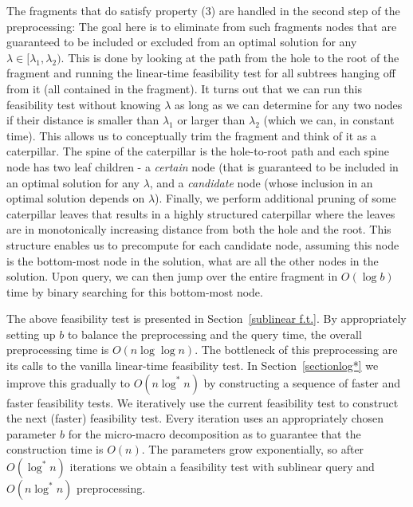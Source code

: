 \documentclass[11pt,a4paper]{article}
\theoremstyle{definition}
\theoremstyle{remark}
\begin{document}
The fragments that do satisfy property (3) are handled in the second step of the preprocessing: The goal here is to eliminate from such fragments nodes that are guaranteed to be included or excluded from an optimal solution for any $\lambda \in [\lambda_1,\lambda_2)$. This is done by looking at the path from the hole to the root of the fragment and running the linear-time feasibility test for all subtrees hanging off from it (all contained in the fragment). It turns out that we can run this feasibility test without knowing $\lambda$ as long as we can determine for any two nodes if their distance is smaller than $\lambda_1$ or larger than $\lambda_2$ (which we can, in constant time). This allows us to conceptually trim the fragment and think of it as a caterpillar. The spine of the caterpillar is the hole-to-root path and each spine node has two leaf children - a \emph{certain} node (that is guaranteed to be included in an optimal solution for any $\lambda$, and a \emph{candidate} node (whose inclusion in an optimal solution depends on $\lambda$). Finally, we perform additional pruning of some caterpillar leaves that results in a highly structured caterpillar where the leaves are in monotonically increasing distance from both the hole and the root. This structure enables us to precompute for each candidate node, assuming this node is the bottom-most node in the solution, what are all the other nodes in the solution. Upon query, we can then jump over the entire fragment  in $O(\log b)$ time by binary searching for this bottom-most node. 

The above feasibility test is presented in Section~\ref{sublinear f.t.}. By appropriately setting up $b$ to balance the preprocessing and the query time, the overall preprocessing time is $O(n\log\log n)$. The bottleneck of this preprocessing are its calls to the vanilla linear-time feasibility test.  
In Section~\ref{sectionlog*} we improve this gradually to $O(n\log^* n)$ by constructing a sequence of faster and faster feasibility tests. 
We iteratively use the current feasibility test to construct the next (faster) feasibility test.
Every iteration uses an appropriately chosen parameter $b$ for the micro-macro decomposition
as to guarantee that the construction time is $O(n)$. The parameters grow exponentially,
so after $O(\log^{*}n)$ iterations we obtain a feasibility test with sublinear query and $O(n\log^* n)$ preprocessing. 
\end{document}
